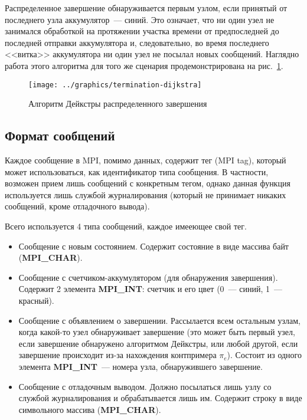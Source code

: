 \documentclass[12pt,a4paper,fleqn]{article}
\newcommand{\Code}[1]{\textbf{\mbox{#1}}}
\begin{document}
Распределенное завершение обнаруживается первым узлом, если принятый от последнего узла
аккумулятор~--- синий. Это означает, что ни один узел не занимался обработкой на протяжении участка
времени от предпоследней до последней отправки аккумулятора и, следовательно, во время последнего
<<витка>> аккумулятора ни один узел не посылал новых сообщений. Наглядно работа этого алгоритма для
того же сценария продемонстрирована на рис.~\ref{fig:termination-dijkstra}.

\begin{figure}[htb]
  \centering
  \texttt{[image: ../graphics/termination-dijkstra]}  
  \caption{Алгоритм Дейкстры распределенного завершения}
\label{fig:termination-dijkstra}
\end{figure}

\subsection{Формат сообщений}

Каждое сообщение в MPI, помимо данных, содержит тег (MPI tag), который может использоваться, как
идентификатор типа сообщения. В частности, возможен прием лишь сообщений с конкретным тегом, однако
данная функция используется лишь службой журналирования (который не принимает никаких сообщений,
кроме отладочного вывода).

Всего используется 4 типа сообщений, каждое имееющее свой тег.
\begin{itemize}
\item Сообщение с новым состоянием. Содержит состояние в виде массива байт
  (\Code{MPI\_CHAR}).
\item Сообщение с счетчиком-аккумулятором (для обнаружения завершения). Содержит 2 элемента
  \Code{MPI\_INT}: счетчик и его цвет (0~--- синий, 1~--- красный).
\item Сообщение с объявлением о завершении. Рассылается всем остальным узлам, когда какой-то узел
  обнаруживает завершение (это может быть первый узел, если завершение обнаружено алгоритмом
  Дейкстры, или любой другой, если завершение происходит из-за нахождения контпримера
  $\pi_e$). Состоит из одного элемента \Code{MPI\_INT}~--- номера узла, обнаружившего завершение.
\item Сообщение с отладочным выводом. Должно посылаться лишь узлу со службой журналирования и
  обрабатывается лишь им. Содержит строку в виде символьного массива (\Code{MPI\_CHAR}).
\end{itemize}
\end{document}
